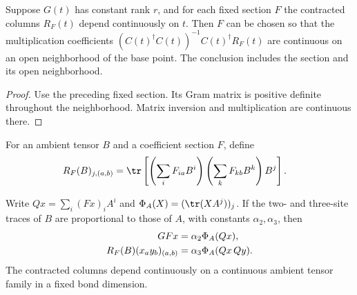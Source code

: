 \begin{lemma}
    \label{thm:spt_trace_quotient_continuous_product}
    \leanok
    Suppose $G(t)$ has constant rank $r$, and for each fixed section
    $F$ the contracted columns $R_F(t)$ depend continuously on $t$.
    Then $F$ can be chosen so that the multiplication coefficients
    $(C(t)^\dagger C(t))^{-1}C(t)^\dagger R_F(t)$ are continuous on
    an open neighborhood of the base point. The conclusion includes
    the section and its open neighborhood.
\end{lemma}

\begin{proof}\leanok
    Use the preceding fixed section. Its Gram matrix is positive
    definite throughout the neighborhood. Matrix inversion and
    multiplication are continuous there.
\end{proof}

\begin{definition}
    \label{def:spt_trace_quotient_triple_columns}
    \leanok
    For an ambient tensor $B$ and a coefficient section $F$, define
    \begin{align}
        R_F(B)_{j,(a,b)}
         & =\tr\left[
            \left(\sum_i F_{ia}B^i\right)
            \left(\sum_k F_{kb}B^k\right)B^j
            \right].
        \notag
    \end{align}
\end{definition}

\begin{lemma}
    \label{thm:spt_trace_quotient_contraction}
    \leanok
    Write $Qx=\sum_i(Fx)_i A^i$ and
    $\Phi_A(X)=(\tr(XA^j))_j$.
    If the two- and three-site traces of $B$ are proportional to those
    of $A$, with constants $\alpha_2,\alpha_3$, then
    \begin{align}
        GFx                     & =\alpha_2\Phi_A(Qx),
        \notag                                             \\
        R_F(B)(x_a y_b)_{(a,b)} & =\alpha_3\Phi_A(Qx\,Qy).
        \notag
    \end{align}
    The contracted columns depend continuously on a continuous ambient
    tensor family in a fixed bond dimension.
\end{lemma}

